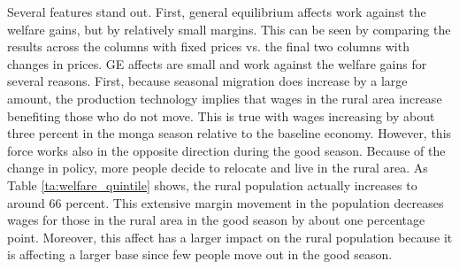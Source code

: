 \documentclass[pdftex,11pt]{article}
\begin{document}
Several features stand out. First, general equilibrium affects work against the welfare gains, but by relatively small margins. This can be seen by comparing the results across the columns with fixed prices vs. the final two columns with changes in prices. GE affects are small and work against the welfare gains for several reasons. First, because seasonal migration does increase by a large amount, the production technology implies that wages in the rural area increase benefiting those who do not move. This is true with wages increasing by about three percent in the monga season relative to the baseline economy. However, this force works also in the opposite direction during the good season. Because of the change in policy, more people decide to relocate and live in the rural area. As Table \ref{ta:welfare_quintile} shows, the rural population actually increases to around 66 percent. This extensive margin movement in the population decreases wages for those in the rural area in the good season by about one percentage point. Moreover, this affect has a larger impact on the rural population because it is affecting a larger base since few people move out in the good season.
\end{document}
